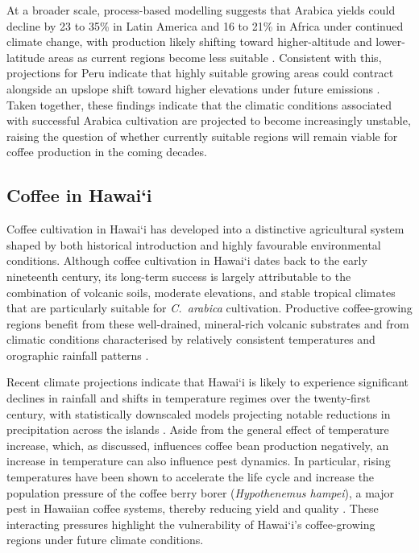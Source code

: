 \documentclass[12pt,a4paper]{article}
\newcommand{\okina}{\textquoteleft}
\begin{document}
At a broader scale, process-based modelling suggests that Arabica yields could decline by 23 to 35\% in Latin America and 16 to 21\% in Africa under continued climate change, with production likely shifting toward higher-altitude and lower-latitude areas as current regions become less suitable \citep{DellaPeruta2025}. Consistent with this, projections for Peru indicate that highly suitable growing areas could contract alongside an upslope shift toward higher elevations under future emissions \citep{Zabaleta2026}. Taken together, these findings indicate that the climatic conditions associated with successful Arabica cultivation are projected to become increasingly unstable, raising the question of whether currently suitable regions will remain viable for coffee production in the coming decades.

\subsection{Coffee in Hawai\okina i}

Coffee cultivation in Hawai\okina i has developed into a distinctive agricultural system shaped by both historical introduction and highly favourable environmental conditions. Although coffee cultivation in Hawai\okina i dates back to the early nineteenth century, its long-term success is largely attributable to the combination of volcanic soils, moderate elevations, and stable tropical climates that are particularly suitable for \textit{C.~arabica} cultivation. Productive coffee-growing regions benefit from these well-drained, mineral-rich volcanic substrates and from climatic conditions characterised by relatively consistent temperatures and orographic rainfall patterns \citep{Hamilton2019}.

Recent climate projections indicate that Hawai\okina i is likely to experience significant declines in rainfall and shifts in temperature regimes over the twenty-first century, with statistically downscaled models projecting notable reductions in precipitation across the islands \citep{Timm2015}. Aside from the general effect of temperature increase, which, as discussed, influences coffee bean production negatively, an increase in temperature can also influence pest dynamics. In particular, rising temperatures have been shown to accelerate the life cycle and increase the population pressure of the coffee berry borer (\textit{Hypothenemus hampei}), a major pest in Hawaiian coffee systems, thereby reducing yield and quality \citep{Hamilton2019, Johnson2024}. These interacting pressures highlight the vulnerability of Hawai\okina i's coffee-growing regions under future climate conditions.
\end{document}

